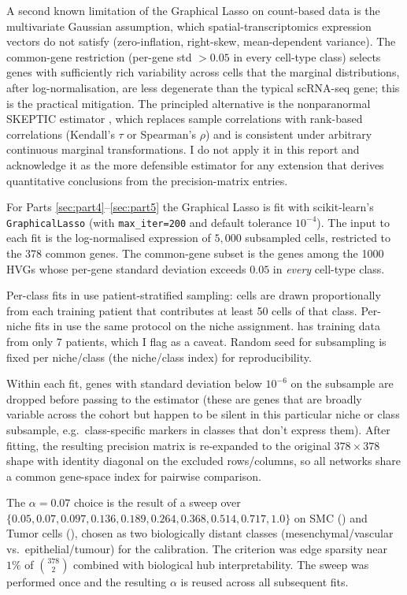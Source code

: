 A second known limitation of the Graphical Lasso on count-based data is the multivariate Gaussian assumption, which spatial-transcriptomics expression vectors do not satisfy (zero-inflation, right-skew, mean-dependent variance). The common-gene restriction (per-gene std $> 0.05$ in every cell-type class) selects genes with sufficiently rich variability across cells that the marginal distributions, after log-normalisation, are less degenerate than the typical scRNA-seq gene; this is the practical mitigation. The principled alternative is the nonparanormal SKEPTIC estimator \cite{liu2012nonparanormal}, which replaces sample correlations with rank-based correlations (Kendall's $\tau$ or Spearman's $\rho$) and is consistent under arbitrary continuous marginal transformations. I do not apply it in this report and acknowledge it as the more defensible estimator for any extension that derives quantitative conclusions from the precision-matrix entries.

For Parts \ref{sec:part4}--\ref{sec:part5} the Graphical Lasso is fit with scikit-learn's \texttt{GraphicalLasso} (with \texttt{max\_iter=200} and default tolerance $10^{-4}$). The input to each fit is the log-normalised expression of $5{,}000$ subsampled cells, restricted to the 378 common genes. The common-gene subset is the genes among the 1000 HVGs whose per-gene standard deviation exceeds $0.05$ in \emph{every} cell-type class.

Per-class fits in  use patient-stratified sampling: cells are drawn proportionally from each training patient that contributes at least 50 cells of that class. Per-niche fits in  use the same protocol on the niche assignment.  has training data from only 7 patients, which I flag as a caveat. Random seed for subsampling is fixed per niche/class (the niche/class index) for reproducibility.

Within each fit, genes with standard deviation below $10^{-6}$ on the subsample are dropped before passing to the estimator (these are genes that are broadly variable across the cohort but happen to be silent in this particular niche or class subsample, e.g.\ class-specific markers in classes that don't express them). After fitting, the resulting precision matrix is re-expanded to the original $378 \times 378$ shape with identity diagonal on the excluded rows/columns, so all networks share a common gene-space index for pairwise comparison.

The $\alpha = 0.07$ choice is the result of a sweep over $\{0.05, 0.07, 0.097, 0.136, 0.189, 0.264, 0.368, 0.514, 0.717, 1.0\}$ on SMC () and Tumor cells (), chosen as two biologically distant classes (mesenchymal/vascular vs.\ epithelial/tumour) for the calibration. The criterion was edge sparsity near $1\%$ of $\binom{378}{2}$ combined with biological hub interpretability. The sweep was performed once and the resulting $\alpha$ is reused across all subsequent fits.

